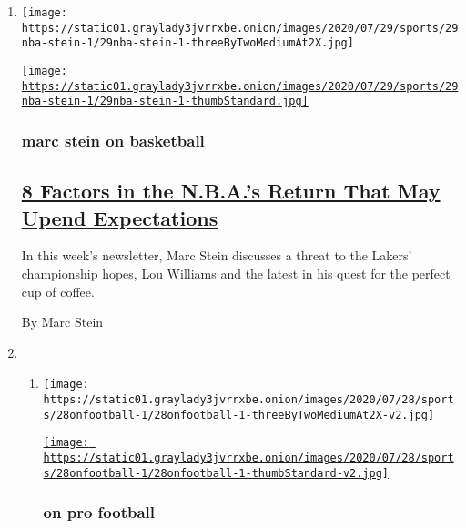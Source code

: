 \begin{enumerate}
\def\labelenumi{\arabic{enumi}.}
\item
  \texttt{[image: https://static01.graylady3jvrrxbe.onion/images/2020/07/29/sports/29nba-stein-1/29nba-stein-1-threeByTwoMediumAt2X.jpg]}

  \href{/2020/07/29/sports/basketball/nba-restart-lou-williams.html}{\texttt{[image: https://static01.graylady3jvrrxbe.onion/images/2020/07/29/sports/29nba-stein-1/29nba-stein-1-thumbStandard.jpg]}}

  \hypertarget{marc-stein-on-basketball}{%
  \subsubsection{marc stein on
  basketball}\label{marc-stein-on-basketball}}

  \hypertarget{8-factors-in-the-nbas-return-that-may-upend-expectations}{%
  \subsection{\texorpdfstring{\href{/2020/07/29/sports/basketball/nba-restart-lou-williams.html}{8
  Factors in the N.B.A.'s Return That May Upend
  Expectations}}{8 Factors in the N.B.A.'s Return That May Upend Expectations}}\label{8-factors-in-the-nbas-return-that-may-upend-expectations}}

  In this week's newsletter, Marc Stein discusses a threat to the
  Lakers' championship hopes, Lou Williams and the latest in his quest
  for the perfect cup of coffee.

  By Marc Stein
\item
  \begin{enumerate}
  \def\labelenumii{\arabic{enumii}.}
  \item
    \texttt{[image: https://static01.graylady3jvrrxbe.onion/images/2020/07/28/sports/28onfootball-1/28onfootball-1-threeByTwoMediumAt2X-v2.jpg]}

    \href{/2020/07/29/sports/football/nfl-mlb-opting-out.html}{\texttt{[image: https://static01.graylady3jvrrxbe.onion/images/2020/07/28/sports/28onfootball-1/28onfootball-1-thumbStandard-v2.jpg]}}

    \hypertarget{on-pro-football}{%
    \subsubsection{on pro football}\label{on-pro-football}}

    \hypertarget{mlbs-botched-return-could-be-a-warning-for-the-nfl}{%
}
\end{enumerate}
\end{enumerate}

